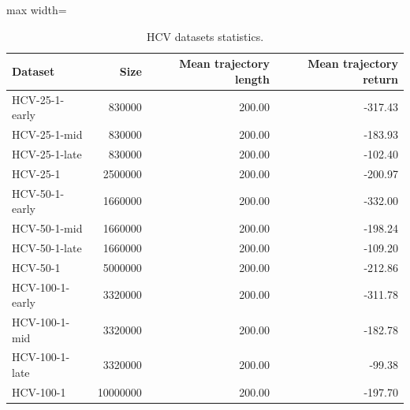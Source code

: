 \documentclass{article}
\begin{document}
\begin{table}[ht]
    \label{tab:hcv_stats}
    \begin{center}
        \caption{HCV datasets statistics.}
    \begin{small}
    \begin{adjustbox}{max width=\columnwidth}
		\begin{tabular}{l|rrr}
		\toprule
	\textbf{Dataset} & \textbf{Size} & \textbf{Mean trajectory length} & \textbf{Mean trajectory return}\\
\midrule
HCV-25-1-early & 830000 & 200.00 & -317.43 \\
HCV-25-1-mid & 830000 & 200.00 & -183.93 \\
HCV-25-1-late & 830000 & 200.00 & -102.40 \\
HCV-25-1 & 2500000 & 200.00 & -200.97 \\
\midrule
HCV-50-1-early & 1660000 & 200.00 & -332.00 \\
HCV-50-1-mid & 1660000 & 200.00 & -198.24 \\
HCV-50-1-late & 1660000 & 200.00 & -109.20 \\
HCV-50-1 & 5000000 & 200.00 & -212.86 \\
\midrule
HCV-100-1-early & 3320000 & 200.00 & -311.78 \\
HCV-100-1-mid & 3320000 & 200.00 & -182.78 \\
HCV-100-1-late & 3320000 & 200.00 & -99.38\\
HCV-100-1 & 10000000 & 200.00 & -197.70\\
\bottomrule
\end{tabular}
        \end{adjustbox}
    \end{small}
    \end{center}
    \vskip -0.1in
\end{table}
\end{document}
